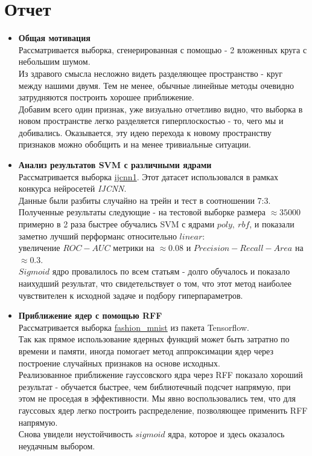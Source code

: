 \section{Отчет}
\begin{itemize}
    \item \textbf{Общая мотивация} \\
    Рассматривается выборка, сгенерированная с помощью \href{https://scikit-learn.org/stable/modules/generated/sklearn.datasets.make_circles.html}{} - 2 вложенных круга с небольшим шумом. \\ Из здравого смысла несложно видеть разделяющее пространство - круг между нашими двумя. Тем не менее, обычные линейные методы очевидно затрудняются построить хорошее приближение. \\
    Добавим всего один признак, уже визуально отчетливо видно, что выборка в новом пространстве легко разделяется гиперплоскостью - то, чего мы и добивались. Оказывается, эту идею перехода к новому пространству признаков можно обобщить и на менее тривиальные ситуации.
     \item \textbf{Анализ результатов SVM с различными ядрами} \\
         Рассматривается выборка \href{https://www.csie.ntu.edu.tw/~cjlin/libsvmtools/datasets/binary.html}{ijcnn1}. Этот датасет использовался в рамках конкурса нейросетей \textit{IJCNN}. \\
         Данные были разбиты случайно на трейн и тест в соотношении 7:3. \\
         Полученные результаты следующие - на тестовой выборке размера $\approx 35000$ примерно в 2 раза быстрее обучались SVM с ядрами $poly, \ rbf$, и показали заметно лучший перформанс относительно $linear$: \\ увеличение $ROC-AUC$ метрики на $\approx 0.08$ и $Precision-Recall-Area$ на $\approx 0.3$. \\
         $Sigmoid$ ядро провалилось по всем статьям - долго обучалось и показало наихудший результат, что свидетельствует о том, что этот метод наиболее чувствителен к исходной задаче и подбору гиперпараметров.
      \item \textbf{Приближение ядер с помощью RFF} \\  
         Рассматривается выборка \href{https://www.tensorflow.org/datasets/catalog/fashion_mnist}{fashion\_mnist} из пакета Tensorflow. \\
         Так как прямое использование ядерных функций может быть затратно по времени и памяти, иногда помогает метод аппроксимации ядер через построение случайных признаков на основе исходных. \\
         Реализованное приближение гауссовского ядра через RFF показало хороший результат - обучается быстрее, чем библиотечный подсчет напрямую, при этом не проседая в эффективности. Мы явно воспользовались тем, что для гауссовых ядер легко построить распределение, позволяющее применить RFF напрямую. \\
         Снова увидели неустойчивость $sigmoid$ ядра, которое и здесь оказалось неудачным выбором. \\
         

\end{itemize}
